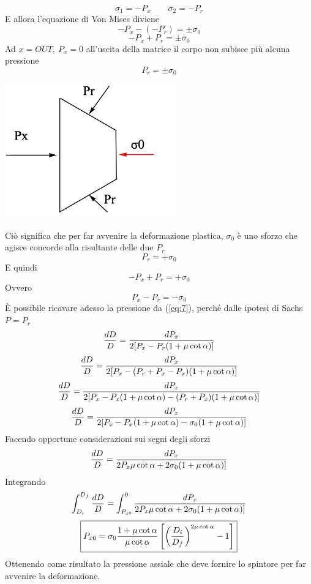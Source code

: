 \documentclass[a4paper, 15pt]{article}
\begin{document}
	\[\sigma_1 = -P_x\qquad\sigma_2 = -P_r\]
	E allora l'equazione di Von Mises diviene
	\[-P_x-(-P_r) = \pm\sigma_0\]
	\[-P_x+P_r = \pm\sigma_0\]
	Ad $x = OUT, ~P_x=0$ all'uscita della matrice il corpo non subisce più alcuna pressione
	\[P_r = \pm\sigma_0\]
\begin{center}
	\includegraphics[width=0.5\linewidth]{figures/def11.2}
\end{center}
	Ciò significa che per far avvenire la deformazione plastica, $\sigma_0$ è uno sforzo che agisce concorde alla risultante delle due $P_r$
	\[P_r = +\sigma_0\]
	E quindi 
	\[-P_x+P_r = +\sigma_0\]
	Ovvero
	\begin{equation}\label{eq:slabest}
		\boxed{P_x-P_r = -\sigma_0}
	\end{equation}
	È possibile ricavare adesso la pressione da (\ref{eq:7}), perché dalle ipotesi di Sachs $P = P_r$
	\[{dD\over D} = \dfrac{dP_x}{2[P_x-P_r(1+\mu\cot\alpha)]}\]
	\[{dD\over D} = \dfrac{dP_x}{2[P_x-(P_r+P_x-P_x)(1+\mu\cot\alpha)]}\]
	\[{dD\over D} = \dfrac{dP_x}{2[P_x-P_x(1+\mu\cot\alpha)-(P_r+P_x)(1+\mu\cot\alpha)]}\]
	\[{dD\over D} = \dfrac{dP_x}{2[P_x-P_x(1+\mu\cot\alpha)-\sigma_0(1+\mu\cot\alpha)]}\]
	Facendo opportune considerazioni sui segni degli sforzi
	\[{dD\over D} = \dfrac{dP_x}{2P_x\mu\cot\alpha+2\sigma_0(1+\mu\cot\alpha)]}\]
	Integrando
	\[\int_{D_i}^{D_f}{dD\over D} = \int_{P_{x0}}^{0}\dfrac{dP_x}{2P_x\mu\cot\alpha+2\sigma_0(1+\mu\cot\alpha)]}\]
	\begin{equation}\label{eq:9}
		\boxed{P_{x0} = \sigma_0\dfrac{1+\mu\cot\alpha}{\mu\cot\alpha}\left[\left(D_i\over D_f\right)^{2\mu\cot\alpha}-1\right]}
	\end{equation}
	Ottenendo come risultato la pressione assiale che deve fornire lo spintore per far avvenire la deformazione.
	
	\newpage
	
\end{document}
